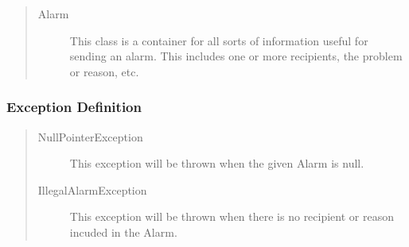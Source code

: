 \begin{quote}
	\begin{description}
		\item[Alarm] This class is a container for all sorts of information useful for
		sending an alarm. This includes one or more recipients, the problem or reason,
		etc.
	\end{description} 
\end{quote}

\subsubsection{Exception Definition} 

\begin{quote}
	\begin{description}
		\item[NullPointerException] This exception will be thrown when the given Alarm
		is null.
		\item[IllegalAlarmException] This exception will be thrown when there is no
		recipient or reason incuded in the Alarm.
	\end{description} 
\end{quote}